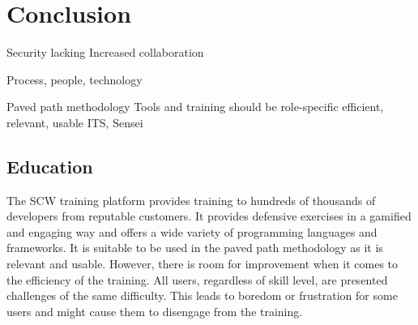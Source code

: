 \chapter{Conclusion}





Security lacking
Increased collaboration

Process, people, technology

Paved path methodology
Tools and training should be role-specific
efficient, relevant, usable
ITS, Sensei

\section{Education}

The SCW training platform provides training to hundreds of thousands of developers from reputable customers. It provides defensive exercises in a gamified and engaging way and offers a wide
variety of programming languages and frameworks. It is suitable
to be used in the paved path methodology as it is relevant and
usable. However, there is room for improvement when it comes
to the efficiency of the training. All users, regardless of skill
level, are presented challenges of the same difficulty. This leads
to boredom or frustration for some users and might cause them
to disengage from the training.

